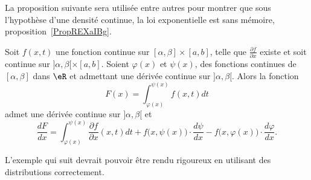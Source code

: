 La proposition suivante sera utilisée entre autres pour montrer que sous l'hypothèse d'une densité continue, la loi exponentielle est sans mémoire, proposition~\ref{PropREXaIBg}.
\begin{proposition}     \label{PropDerrFnAvecBornesFonctions}
	Soit \( f(x,t)\) une fonction continue sur \( [\alpha,\beta]\times[a,b]\), telle que \( \frac{ \partial f }{ \partial x }\) existe et soit continue sur \( ]\alpha,\beta[\times[a,b]\). Soient \( \varphi(x)\) et \( \psi(x)\), des fonctions continues de \( [\alpha,\beta]\) dans \( \eR\) et admettant une dérivée continue sur \( ]\alpha,\beta [\). Alors la fonction
		\begin{equation}
			F(x)=\int_{\varphi(x)}^{\psi(x)}f(x,t)dt
		\end{equation}
		admet une dérivée continue sur \( ]\alpha,\beta[\) et
	\begin{equation}    \label{EqFormDerrFnAvecBorneNInt}
		\frac{ dF }{ dx }=\int_{\varphi(x)}^{\psi(x)}\frac{ \partial f }{ \partial x }(x,t)dt+f\big( x,\psi(x) \big)\cdot\frac{ d\psi }{ dx }- f\big( x,\varphi(x) \big)\cdot\frac{ d\varphi }{ dx }.
	\end{equation}
\end{proposition}

L'exemple qui suit devrait pouvoir être rendu rigoureux en utilisant des distributions correctement.

